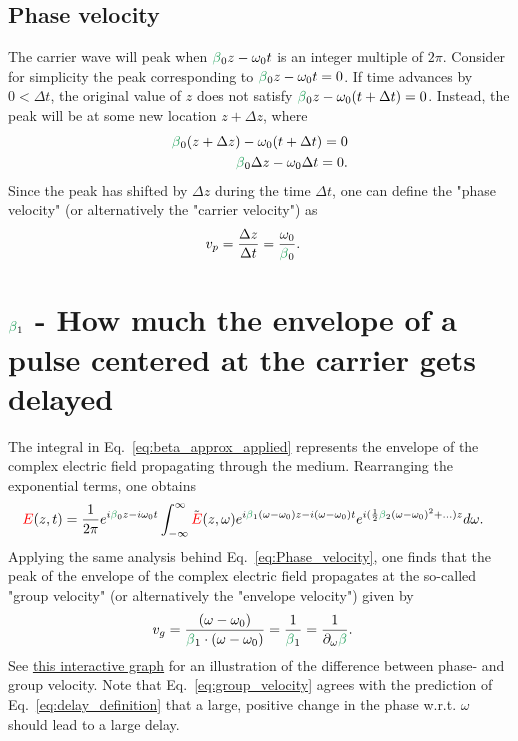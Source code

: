 \subsection{Phase velocity}
\label{sec:Phase_velocity}
The carrier wave will peak when $\betag_0z-\omega_0t$ is an integer multiple of $2\pi$. Consider for simplicity the peak corresponding to $\betag_0z-\omega_0t=0$. If time advances by $0<\Delta t$, the original value of $z$ does not satisfy $\betag_0z-\omega_0(t+\Delta t)=0$. Instead, the peak will be at some new location $z+\Delta z$, where
\begin{align}
    \betag_0(z+\Delta z)-\omega_0(t+\Delta t)=0\\ \nonumber
    \betag_0\Delta z-\omega_0\Delta t=0.
\end{align}
Since the peak has shifted by $\Delta z$ during the time $\Delta t$, one can define the "phase velocity" (or alternatively the "carrier velocity") as
\begin{align}
\label{eq:Phase_velocity}
    v_p &= \frac{\Delta z}{\Delta t} = \frac{\omega_0}{\betag_0}.
\end{align}


\section{$\betag_1$ - How much the envelope of a pulse centered at the carrier gets delayed}
The integral in Eq.~\ref{eq:beta_approx_applied} represents the envelope of the complex electric field propagating through the medium. Rearranging the exponential terms, one obtains
\begin{align}
\label{eq:envelope_beta1}
    \E(z,t) &= \frac{1}{2\pi} e^{i\betag_0z-i\omega_0t}  \int_{-\infty}^{\infty} \Tilde{\E}(z,\omega) e^{i\betag_1(\omega-\omega_0)z-i(\omega-\omega_0) t} e^{i(\frac{1}{2}\betag_2(\omega-\omega_0)^2+...)z} d\omega.
\end{align}
Applying the same analysis behind Eq.~\ref{eq:Phase_velocity}, one finds that the peak of the envelope of the complex electric field propagates at the so-called "group velocity" (or alternatively the "envelope velocity") given by
\begin{align}
\label{eq:group_velocity}
    v_g &= \frac{(\omega-\omega_0)}{\betag_1\cdot(\omega-\omega_0)} = \frac{1}{\betag_1} = \frac{1}{\partial_\omega\betag}.
\end{align}
See \href{https://www.desmos.com/calculator/rq2physwac}{this interactive graph} for an illustration of the difference between phase- and group velocity. Note that Eq.~\ref{eq:group_velocity} agrees with the prediction of Eq.~\ref{eq:delay_definition} that a large, positive change in the phase w.r.t. $\omega$ should lead to a large delay.




